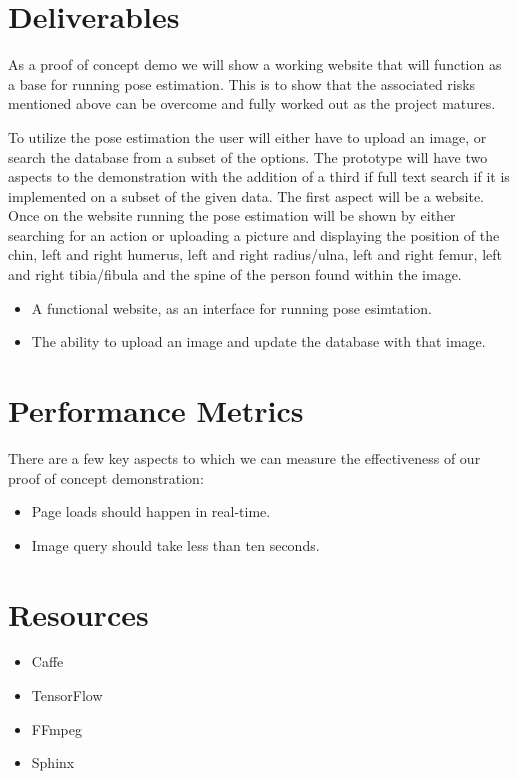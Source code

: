 \documentclass[a4paper, 12pt]{article}
\begin{document}
\section{Deliverables}
{As a proof of concept demo we will show a working website that will function
as a base for running pose estimation. This is to show that the associated
risks mentioned above can be overcome and fully worked out as the project
matures.

To utilize the pose estimation the user will either have to upload an
image, or search the database from a subset of the options. The prototype will
have two aspects to the demonstration with the addition of a third if full text
search if it is implemented on a subset of the given data. The first aspect
will be a website. Once on the website running the pose estimation will be
shown by either searching for an action or uploading a picture and displaying
the position of the chin, left and right humerus, left and right radius/ulna,
left and right femur, left and right tibia/fibula and the spine of the person
found within the image. 

\begin{itemize}
        \item A functional website, as an interface for running pose esimtation.
        \item The ability to upload an image and update the database with that
                image.
\end{itemize}
}

\section{Performance Metrics}
There are a few key aspects to which we can measure the effectiveness of our
proof of concept demonstration:

\begin{itemize}
        \item Page loads should happen in real-time.
        \item Image query should take less than ten seconds.
\end{itemize}

\section{Resources}
\begin{itemize}
    \item Caffe
    \item TensorFlow
    \item FFmpeg
    \item Sphinx 
\end{itemize}
\end{document}
